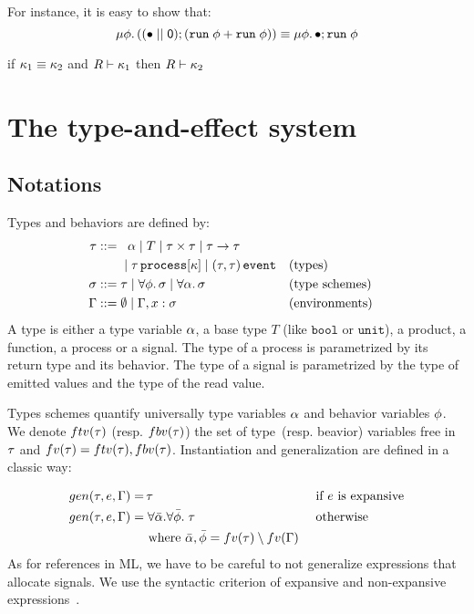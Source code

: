 \documentclass[9pt,preprint]{sigplanconf}
\newcommand{\sdeq}{::=}
\begin{document}
For instance, it is easy to show that:
\[
\mu \phi.\, ((\bullet \mid\mid \textsf{0}) ; (\mathtt{run}\; \phi + \mathtt{run}\; \phi))  \equiv  \mu \phi.\, \bullet ; \mathtt{run}\; \phi
\]

\begin{property}
\label{prop:equiv_reactivty}
if $\kappa_1 \equiv \kappa_2$ and $R \vdash \kappa_1$ then $R \vdash \kappa_2$
\end{property}

\section{The type-and-effect system}
\label{sec:type_system}



\subsection{Notations}

Types and behaviors are defined by:
\begin{align*}
\rt \sdeq &\;\;\; \rtvar \mid T \mid \rtprod{\rt}{\rt} \mid \rtarrow{\rt}{\rt} \\
    &\;\mid \rtproc{\rt}{\rk} \mid \rtsig{\rt}{\rt} && \text{(types)} \\
\rs \sdeq &\; \rt \mid \forall \effvar.\, \rs \mid \forall \rtvar.\, \rs && \text{(type schemes)} \\
\tyenv \sdeq&\; \emptyset \mid \tyenv \tyconcat x : \rs && \text{(environments)}
\end{align*}
A type is either a type variable $\alpha$, a base type $T$ (like $\mathtt{bool}$ or $\mathtt{unit}$), a product, a function, a process or a signal. The type of a process is parametrized by its return type and its behavior. The type of a signal is parametrized by the type of emitted values and the type of the read value.

Types schemes quantify universally type variables $\alpha$ and behavior variables $\phi$. We denote $ftv(\tau)$ (resp. $fbv(\tau)$) the set of type~(resp. beavior) variables free in $\tau$ and $fv(\tau) = ftv(\tau), fbv(\tau)$. Instantiation and generalization are defined in a classic way:
\vspace{-1.3em}
\begin{align*}
gen(\tau, e, \Gamma) = &\, \tau && \text { if $e$ is expansive} \\
gen(\tau, e, \Gamma) = &\; \forall \bar{\alpha}.\forall \bar{\phi}.\; \tau  && \text{ otherwise } \\
  & \text{ where }  \bar{\alpha}, \bar{\phi} = fv(\tau) \setminus fv(\Gamma)  
\end{align*}
As for references in ML, we have to be careful to not generalize expressions that allocate signals. We use the syntactic criterion of expansive and non-expansive expressions~\cite{Tofte:1990}.
\end{document}
